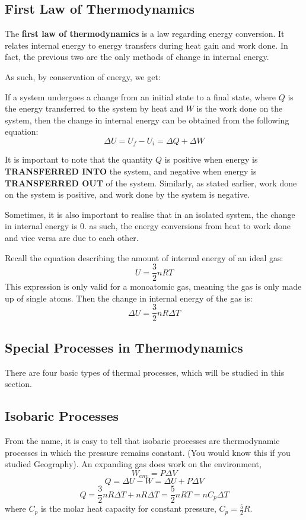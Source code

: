 \subsection{First Law of Thermodynamics}
The \textbf{first law of thermodynamics} is a law regarding energy conversion. It relates internal energy to energy transfers during heat gain and work done. In fact, the previous two are the only methods of change in internal energy.

As such, by conservation of energy, we get:

\begin{defi}
If a system undergoes a change from an initial state to a final state, where $Q$ is the energy transferred to the system by heat and $W$ is the work done on the system, then the change in internal energy can be obtained from the following equation:
$$\Delta U= U_f-U_i=\Delta Q+\Delta W$$
\end{defi}

It is important to note that the quantity $Q$ is positive when energy is \textbf{TRANSFERRED INTO} the system, and negative when energy is \textbf{TRANSFERRED OUT} of the system. Similarly, as stated earlier, work done on the system is positive, and work done by the system is negative.

Sometimes, it is also important to realise that in an isolated system, the change in internal energy is 0. as such, the energy conversions from heat to work done and vice versa are due to each other.

Recall the equation describing the amount of internal energy of an ideal gas:
$$U=\frac{3}{2}nRT$$
This expression is only valid for a monoatomic gas, meaning the gas is only made up of single atoms. Then the change in internal energy of the gas is:
$$\Delta U = \frac{3}{2}nR\Delta T$$

\subsection{Special Processes in Thermodynamics}
There are four basic types of thermal processes, which will be studied in this section.

\subsection{Isobaric Processes}
From the name, it is easy to tell that isobaric processes are thermodynamic processes in which the pressure remains constant. (You would know this if you studied Geography). An expanding gas does work on the environment,
$$W_{env}=P\Delta V$$
$$Q=\Delta U-W=\Delta U + P\Delta V$$
$$Q=\frac{3}{2}nR\Delta T + nR\Delta T=\frac{5}{2}nRT=nC_p\Delta T$$
where $C_p$ is the molar heat capacity for constant pressure, $C_p=\frac{5}{2}R$.

